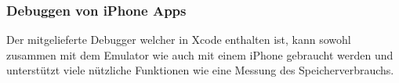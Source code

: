 \subsubsection{Debuggen von iPhone Apps} %
\label{ssub: Debuggen}
Der mitgelieferte Debugger welcher in Xcode enthalten ist, kann sowohl zusammen mit dem Emulator wie auch mit einem iPhone gebraucht werden und unterstützt viele nützliche Funktionen wie eine Messung des Speicherverbrauchs.

